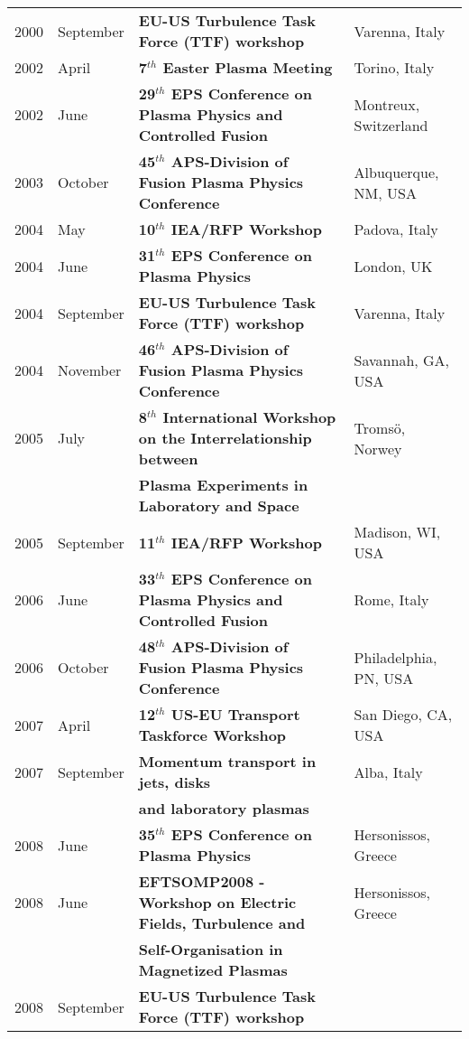 {\begin{entrylist}
\end{entrylist}
}{
\begin{longtable}{llll}
2000 & September & \textbf{EU-US Turbulence Task Force (TTF) workshop}
& Varenna, Italy \\
2002 & April & \textbf{7$^{th}$ Easter Plasma Meeting}& Torino, Italy
\\
2002 & June & \textbf{29$^{th}$ EPS Conference on Plasma Physics and
  Controlled Fusion} & Montreux, Switzerland \\
2003 & October & \textbf{45$^{th}$ APS-Division of Fusion Plasma
  Physics Conference}& Albuquerque, NM, USA \\
2004 & May & \textbf{10$^{th}$ IEA/RFP Workshop}& Padova, Italy \\
2004 & June & \textbf{31$^{th}$ EPS Conference on Plasma Physics} &
London, UK \\
2004 & September & \textbf{EU-US Turbulence Task Force (TTF) workshop}
& Varenna, Italy \\
2004 & November & \textbf{46$^{th}$ APS-Division of Fusion Plasma
  Physics Conference} & Savannah, GA, USA \\
2005 & July & \textbf{8$^{th}$ International Workshop on the
  Interrelationship between} & Troms\"o, Norwey \\
 & & \textbf{Plasma Experiments in Laboratory and
  Space} & \\
2005 & September & \textbf{11$^{th}$ IEA/RFP Workshop} & Madison, WI,
USA \\
2006 & June & \textbf{33$^{th}$ EPS Conference on Plasma Physics and
  Controlled Fusion} & Rome, Italy \\
2006 & October & \textbf{48$^{th}$ APS-Division of Fusion Plasma
  Physics Conference} & Philadelphia, PN, USA \\
2007 & April & \textbf{12$^{th}$ US-EU Transport Taskforce Workshop} &
San Diego, CA, USA \\
2007 & September & \textbf{Momentum transport in jets, disks} & Alba,
Italy \\
& & \textbf{ and laboratory plasmas} & \\
2008 & June & \textbf{35$^{th}$ EPS Conference on Plasma Physics} &
Hersonissos, Greece \\
2008 & June & \textbf{EFTSOMP2008 - Workshop on Electric Fields, Turbulence
                 and} & Hersonissos, Greece \\
& & \textbf{Self-Organisation in Magnetized Plasmas} & \\
2008 & September & \textbf{EU-US Turbulence Task Force (TTF) workshop}

\end{longtable}}
